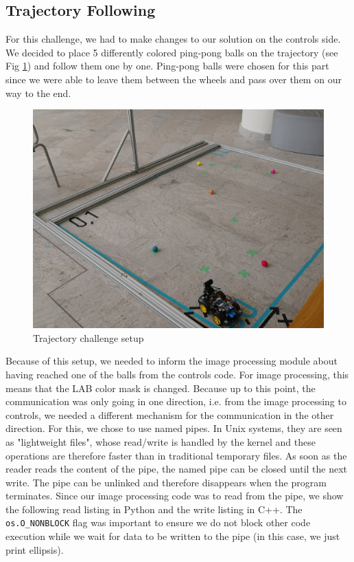 \documentclass[12pt, twoside, a4paper, titlepage]{article}
\begin{document}
\subsection{Trajectory Following}
For this challenge, we had to make changes to our solution on the controls side. We decided to place 5 differently colored ping-pong balls on the trajectory (see Fig \ref{trajectory}) and follow them one by one. Ping-pong balls were chosen for this part since we were able to leave them between the wheels and pass over them on our way to the end.
\begin{figure}[h]
\caption{Trajectory challenge setup}\label{trajectory}
\begin{center}
\includegraphics[width=0.9\columnwidth]{trajectory.jpg}
\end{center}
\end{figure}
\newline
Because of this setup, we needed to inform the image processing module about having reached one of the balls from the controls code. For image processing, this means that the LAB color mask is changed. Because up to this point, the communication was only going in one direction, i.e. from the image processing to controls, we needed a different mechanism for the communication in the other direction. For this, we chose to use named pipes. In Unix systems, they are seen as "lightweight files", whose read/write is handled by the kernel and these operations are therefore faster than in traditional temporary files. As soon as the reader reads the content of the pipe, the named pipe can be closed until the next write. The pipe can be unlinked and therefore disappears when the program terminates. Since our image processing code was to read from the pipe, we show the following read listing in Python and the write listing in C++. The \texttt{os.O\_NONBLOCK} flag was important to ensure we do not block other code execution while we wait for data to be written to the pipe (in this case, we just print ellipsis).  
\end{document}
